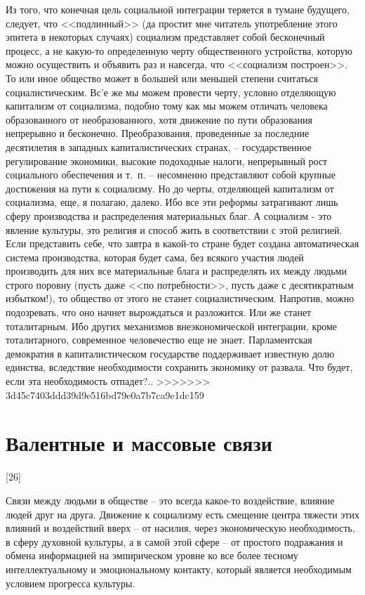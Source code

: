\documentclass{book}
\begin{document}
Из того, что конечная цель социальной интеграции теряется в тумане будущего, следует, что <<подлинный>> (да простит мне читатель употребление этого эпитета в некоторых случаях) социализм представляет собой бесконечный процесс, а не какую-то определенную черту общественного устройства, которую можно осуществить и объявить раз и навсегда, что <<социализм построен>>. То или иное общество может в большей или мень­шей степени считаться социалистическим. Вс'е же мы можем провести черту, условно отделяющую капитализм от социализ­ма, подобно тому как мы можем отличать человека образо­ванного от необразованного, хотя движение по пути образо­вания непрерывно и бесконечно. Преобразования, проведенные за последние десятилетия в западных капиталистических стра­нах, -- государственное регулирование экономики, высокие по­доходные налоги, непрерывный рост социального обеспечения и т.~п. -- несомненно представляют собой крупные достижения на пути к социализму. Но до черты, отделяющей капитализм от социализма, еще, я полагаю, 
далеко. Ибо все эти реформы за­трагивают лишь сферу производства и распределения матери­альных благ. А социализм - это явление культуры, это религия и способ жить в соответствии с этой религией. Если предста­вить себе, что завтра в какой-то стране будет создана автомати­ческая система производства, которая будет сама, без всякого участия людей  производить для них все материальные блага и распределять их между людьми строго поровну (пусть даже <<по потребности>>, пусть даже с десятикратным избытком!), то общество от этого не станет социалистическим. Напротив, можно подозревать, что оно начнет вырождаться и разложится. Или же станет тоталитарным. Ибо других механизмов внеэконо­мической интеграции, кроме тоталитарного, современное чело­вечество еще не знает. Парламентская демократия в капитали­стическом государстве поддерживает известную долю единства, вследствие необходимости сохранить экономику от развала. Что будет, если эта необходимость отпадет?..
>>>>>>> 3d45c7403ddd39d9e516bd79e0a7b7ca9e1dc159



\section{Валентные и массовые связи}
[26]

Связи между людьми в обществе -- это всегда какое-то воздействие, влияние людей друг на друга. Движение к социализму есть смещение центра тяжести этих влияний и воздействий вверх -- от насилия, через экономическую необходимость, в сферу духовной культуры, а в самой этой сфере -- от простого подражания и обмена информацией на эмпирическом уровне ко все более тесному интеллектуальному и эмоциональному контакту, который является необходимым условием прогресса культуры.
\end{document}
